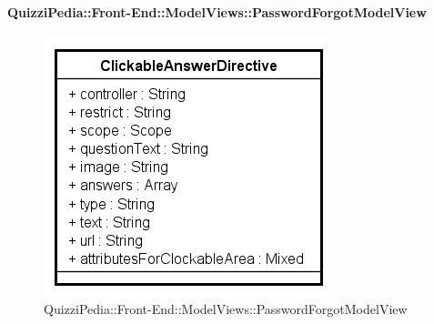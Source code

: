 \paragraph{QuizziPedia::Front-End::ModelViews::PasswordForgotModelView}
	
	\label{QuizziPedia::Front-End::ModelViews::PasswordForgotModelView}
	
	\begin{figure}[ht]
		\centering
		\includegraphics[scale=0.5,keepaspectratio]{UML/Classi/Front-End/QuizziPedia_Front-end_Templates_ClickableAnswerTemplate.png}
		\caption{QuizziPedia::Front-End::ModelViews::PasswordForgotModelView}
	\end{figure} \FloatBarrier
	
